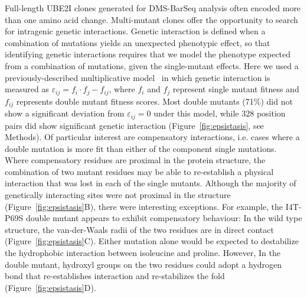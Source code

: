 Full-length UBE2I clones generated for DMS-BarSeq analysis often encoded more than one amino acid change. Multi-mutant clones offer the opportunity to search for intragenic genetic interactions. Genetic interaction is defined when a combination of mutations yields an unexpected phenotypic effect, so that identifying genetic interactions requires that we model the phenotype expected from a combination of mutations, given the single-mutant effects.  Here we used a previously-described multiplicative model~\cite{phillips_language_1998,onge_systematic_2007} in which genetic interaction is measured as $\varepsilon_{ij} = f_i \cdot f_j - f_{ij}$, where $f_i$ and $f_j$ represent single mutant fitness and $f_{ij}$ represents double mutant fitness scores. Most double mutants (71\%) did not show a significant deviation from $\varepsilon_{ij} = 0$ under this model, while 328 position pairs did show significant genetic interaction (Figure~\ref{fig:epsistasis}, see Methods). Of particular interest are compensatory interactions, i.e. cases where a double mutation is more fit than either of the component single mutations.  Where compensatory residues are proximal in the protein structure, the combination of two mutant residues may be able to re-establish a physical interaction that was lost in each of the single mutants. Although the majority of genetically interacting sites were not proximal in the structure (Figure~\ref{fig:epsistasis}B), there were interesting exceptions. For example, the I4T-P69S double mutant appears to exhibit compensatory behaviour: In the wild type structure, the van-der-Waals radii of the two residues are in direct contact (Figure~\ref{fig:epsistasis}C). Either mutation alone would be expected to destabilize the hydrophobic interaction between isoleucine and proline.  However, In the double mutant, hydroxyl groups on the two residues could adopt a hydrogen bond that re-establishes interaction and re-stabilizes the fold (Figure~\ref{fig:epsistasis}D).

